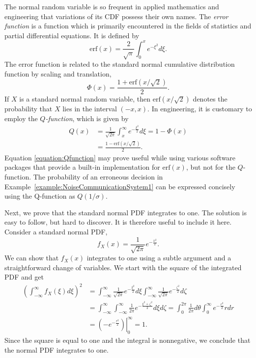 The normal random variable is so frequent in applied mathematics and engineering that variations of its CDF possess their own names.
The \emph{error function} is a function which is primarily encountered in the fields of statistics and partial differential equations. 
It is defined by
\begin{equation*}
\mathrm{erf} (x) = \frac{2}{\sqrt{\pi}} \int_0^x e^{-\xi^2} d\xi .
\end{equation*}
The error function is related to the standard normal cumulative distribution function by scaling and translation,
\begin{equation*}
\Phi (x) = \frac{1 + \mathrm{erf} \left( {x}/{\sqrt{2}} \right)}{2}.
\end{equation*}
If $X$ is a standard normal random variable, then $\mathrm{erf} \left( x/{\sqrt{2}} \right)$ denotes the probability that $X$ lies in the interval $(-x, x)$.
In engineering, it is customary to employ the \emph{$Q$-function}, which is given by 
\begin{equation} \label{equation:Qfunction}
\begin{split}
Q (x) &= \frac{1}{\sqrt{2 \pi}} \int_x^{\infty} e^{-\frac{\xi^2}{2}} d\xi
= 1 - \Phi (x) \\
&= \frac{ 1 - \mathrm{erf} \left( {x}/{\sqrt{2}} \right) }{2} .
\end{split}
\end{equation}
Equation \eqref{equation:Qfunction} may prove useful while using various software packages that provide a built-in implementation for $\mathrm{erf}(x)$, but not for the $Q$-function.
The probability of an erroneous decision in Example~\ref{example:NoiseCommunicationSystem1} can be expressed concisely using the Q-function as $Q (1/\sigma)$.


Next, we prove that the standard normal PDF integrates to one.
The solution is easy to follow, but hard to discover.
It is therefore useful to include it here.
Consider a standard normal PDF,
\begin{equation*}
f_X(x) = \frac{1}{\sqrt{2 \pi}} e^{- \frac{x^2}{2}} .
\end{equation*}
We can show that $f_X (x)$ integrates to one using a subtle argument and a straightforward change of variables.
We start with the square of the integrated PDF and get
\begin{equation*}
\begin{split}
\left(\int_{- \infty}^{\infty} f_X (\xi) d\xi \right)^2
&= \int_{- \infty}^{\infty} \frac{1}{\sqrt{2 \pi}} e^{- \frac{\xi^2}{2}} d\xi
\int_{- \infty}^{\infty} \frac{1}{\sqrt{2 \pi}} e^{- \frac{\zeta^2}{2}} d\zeta \\
&= \int_{- \infty}^{\infty} \int_{- \infty}^{\infty}
\frac{1}{2 \pi} e^{- \frac{\xi^2 + \zeta^2}{2}} d\xi d\zeta
= \int_{0}^{2 \pi} \frac{1}{2 \pi} d\theta
\int_{0}^{\infty} e^{- \frac{r^2}{2}} r dr \\
&= \left. \left( - e^{- \frac{r^2}{2}} \right) \right|_0^{\infty} = 1.
\end{split}
\end{equation*}
Since the square is equal to one and the integral is nonnegative, we conclude that the normal PDF integrates to one.



